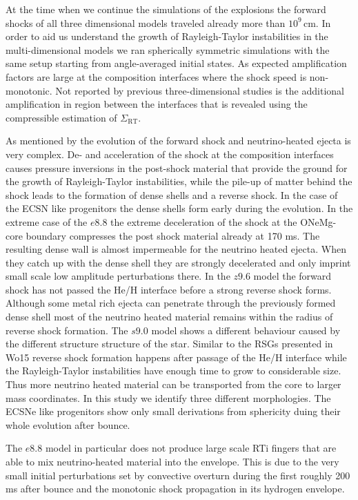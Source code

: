 \documentclass[fleqn,usenatbib]{mnras}
\begin{document}
At the time when we continue the simulations of the explosions the forward shocks of all three dimensional models traveled already more than $10^9\,\mathrm{cm}$. 
In order to aid us understand the growth of Rayleigh-Taylor instabilities in the multi-dimensional models we ran spherically symmetric simulations with the same setup starting from angle-averaged initial states. As expected amplification factors are large at the composition interfaces where the shock speed is non-monotonic. Not reported by previous three-dimensional studies is the additional amplification in region between the interfaces that is revealed using the compressible estimation of $\Sigma_{\mathrm{RT}}$.

As mentioned by \citet{Wongwathanarat2015} the evolution of the forward shock and neutrino-heated ejecta is very complex. De- and acceleration of the shock at the composition interfaces causes pressure inversions in the post-shock material that provide the ground for the growth of Rayleigh-Taylor instabilities, while the pile-up of matter behind the shock leads to the formation of dense shells and a reverse shock. 
In the case of the ECSN like progenitors the dense shells form early during the evolution. In the extreme case of the $e8.8$ the extreme deceleration of the shock at the ONeMg-core boundary compresses the post shock material already at 170 ms. The resulting dense wall is almost impermeable for the neutrino heated ejecta. When they catch up with the dense shell they are strongly decelerated and only imprint small scale low amplitude perturbations there. 
In the $z9.6$ model the forward shock has not passed the He/H interface before a strong reverse shock forms. Although some metal rich ejecta can penetrate through the previously formed dense shell most of the neutrino heated material remains within the radius of reverse shock formation.
The $s9.0$ model shows a different behaviour caused by the different structure structure of the star. Similar to the RSGs presented in Wo15 reverse shock formation happens after passage of the He/H interface while the Rayleigh-Taylor instabilities have enough time to grow to considerable size. Thus more neutrino heated material can be transported from the core to larger mass coordinates. 
In this study we identify three different morphologies.
The ECSNe like progenitors show only small derivations from sphericity duing their whole evolution after bounce.

The $e8.8$ model in particular does not produce large scale RTi fingers that are able to mix neutrino-heated material into the envelope. This is due to the very small initial perturbations set by convective overturn during the first roughly 200 ms after bounce and the monotonic shock propagation in its hydrogen envelope. 
\end{document}
